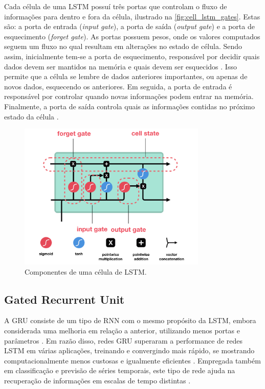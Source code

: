 Cada célula de uma LSTM possuí três portas que controlam o fluxo de informações para dentro e fora da célula, ilustrado na \autoref{fig:cell_lstm_gates}. Estas são: a porta de entrada (\textit{input gate}), a porta de saída (\textit{output gate}) e a porta de esquecimento (\textit{forget gate}). As portas possuem pesos, onde os valores computados seguem um fluxo no qual resultam em alterações no estado de célula. Sendo assim, inicialmente tem-se a porta de esquecimento, responsável por decidir quais dados devem ser mantidos na memória e quais devem ser esquecidos \cite{Phi2020}. Isso permite que a célula se lembre de dados anteriores importantes, ou apenas de novos dados, esquecendo os anteriores. Em seguida, a porta de entrada é responsável por controlar quando novas informações podem entrar na memória. Finalmente, a porta de saída controla quais as informações contidas no próximo estado da célula \cite{Jones2017}.

\begin{figure}[h]
  \centering
  \caption{Componentes de uma célula de LSTM.}
   \label{fig:cell_lstm_gates}
   \includegraphics[width=0.8\textwidth]{figuras/fig_9.png}
\end{figure}

\subsection{Gated Recurrent Unit}

A GRU consiste de um tipo de RNN com o mesmo propósito da LSTM, embora considerada uma melhoria em relação a anterior, utilizando menos portas e parâmetros \cite{Kumar2019,Bianchi2017}. Em razão disso, redes GRU superaram a performance de redes LSTM em várias aplicações, treinando e convergindo mais rápido, se mostrando computacionalmente menos custosas e igualmente eficientes \cite{Kumar2019,Bianchi2017}. Empregada também em classificação e previsão de séries temporais, este tipo de rede ajuda na recuperação de informações em escalas de tempo distintas \cite{Bianchi2017,Kumar2019}. 

